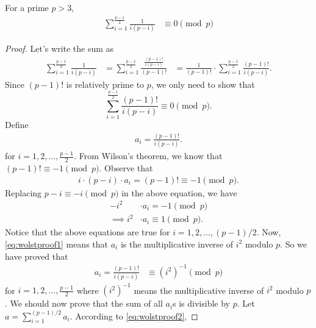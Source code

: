 \documentclass[12pt]{subfile}
\begin{document}
		\begin{lemma}\label{lem:wolstproof4}
			For a prime $p>3$,
				\begin{align*}
					\sum_{i=1}^{\frac{p-1}{2}} \frac{1}{i(p-i)}
						& \equiv 0 \pmod p
				\end{align*}
		\end{lemma}

		\begin{proof}
			Let's write the sum as
				\begin{align*}
					\sum_{i=1}^{\frac{p-1}{2}} \frac{1}{i(p-i)}
						& = \sum_{i=1}^{\frac{p-1}{2}} \frac{\frac{(p-1)!}{i(p-i)}}{(p-1)!}
						& = \frac{1}{(p-1)!} \cdot \sum_{i=1}^{\frac{p-1}{2}} \frac{(p-1)!}{i(p-i)}.
				\end{align*}
			Since $(p-1)!$ is relatively prime to $p$, we only need to show that $$\displaystyle \sum_{i=1}^{\frac{p-1}{2}} \frac{(p-1)!}{i(p-i)} \equiv 0 \pmod p.$$
			Define
				\begin{align*}
					a_i = \frac{(p-1)!}{i(p-i)}.
				\end{align*}
			for $i=1,2,\ldots,\frac{p-1}{2}$. From Wilson's theorem, we know that $(p-1)! \equiv -1 \pmod p$. Observe that
				\begin{align*}
					i\cdot (p-i) \cdot a_i = (p-1)! \equiv -1 \pmod p.
				\end{align*}
			Replacing $p-i \equiv -i \pmod p$ in the above equation, we have
				\begin{align}\label{eq:wolstproof1}
					-i^2
						& \cdot a_i = -1 \pmod p\\
					\implies i^2
						& \cdot a_i \equiv 1 \pmod p.
				\end{align}
			Notice that the above equations are true for $i=1,2,\ldots,(p-1)/2$. Now, \eqref{eq:wolstproof1} means that $a_i$ is the multiplicative inverse of $i^2$ modulo $p$. So we have proved that
				\begin{align}\label{eq:wolstproof2}
					a_i = \frac{(p-1)!}{i(p-i)}
						& \equiv (i^2)^{-1} \pmod p
				\end{align}
			for $i=1,2,\ldots,\frac{p-1}{2}$ where $(i^2)^{-1}$ means the multiplicative inverse of $i^2$ modulo $p$. We should now prove that the sum of all $a_i$s is divisible by $p$. Let $ a=\sum_{i=1}^{(p-1)/2} a_i$. According to \eqref{eq:wolstproof2},

\end{proof}
\end{document}
